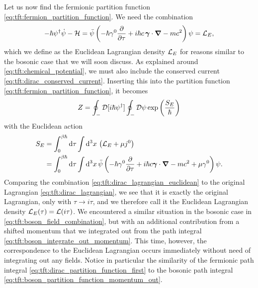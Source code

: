 Let us now find the fermionic partition function \eqref{eq:tft:fermion_partition_function}.
We need the combination
\begin{equation}
	-\hbar \psi^\dagger \dot\psi - \mathcal{H} =
	\bar\psi \left( -\hbar \gamma^0 \pdv{}{\tau} + i \hbar c \, {\bm{\gamma}} \cdot {\bm{\nabla}} - mc^2 \right) \psi =
	\mathcal{L}_E ,
\label{eq:tft:dirac_lagrangian_euclidean}
\end{equation}
which we define as the Euclidean Lagrangian density $\mathcal{L}_E$ for reasons similar to the bosonic case that we will soon discuss.
As explained around \cref{eq:tft:chemical_potential}, we must also include the conserved current \eqref{eq:tft:dirac_conserved_current}.
Inserting this into the partition function \eqref{eq:tft:fermion_partition_function}, it becomes
\begin{equation}
	Z = \oint_- \mathcal{D} [i \hbar \psi^\dagger] \oint_- \mathcal{D} \psi
	    \exp \left( \frac{S_E}{\hbar} \right)
\label{eq:tft:dirac_partition_function_first}
\end{equation}
with the Euclidean action
\begin{equation}
\begin{split}
	S_E &= \int_0^{\beta \hbar} \mathop{}\!\mathrm{d} \tau \int \mathop{}\!\mathrm{d}^3 x \, \left( \mathcal{L}_E + \mu j^0 \right) \\
	    &= \int_0^{\beta \hbar} \mathop{}\!\mathrm{d} \tau \int \mathop{}\!\mathrm{d}^3 x \, \bar\psi \left( -\hbar \gamma^0 \pdv{}{\tau} + i \hbar c {\bm{\gamma}} \cdot {\bm{\nabla}} - mc^2 + \mu \gamma^0 \right) \psi .
\end{split}
\label{eq:tft:dirac_action_euclidean}
\end{equation}
Comparing the combination \eqref{eq:tft:dirac_lagrangian_euclidean} to the original Lagrangian \eqref{eq:tft:dirac_lagrangian}, we see that it is exactly the original Lagrangian, only with $\tau \rightarrow i \tau$, and we therefore call it the Euclidean Lagrangian density $\mathcal{L}_E(\tau) = \mathcal{L}(i \tau)$.
We encountered a similar situation in the bosonic case in \cref{eq:tft:boson_field_combination}, but with an additional contribution from a shifted momentum that we integrated out from the path integral \eqref{eq:tft:boson_integrate_out_momentum}.
This time, however, the correspondence to the Euclidean Lagrangian occurs immediately without need of integrating out any fields.
Notice in particular the similarity of the fermionic path integral \eqref{eq:tft:dirac_partition_function_first} to the bosonic path integral \eqref{eq:tft:boson_partition_function_momentum_out}.

